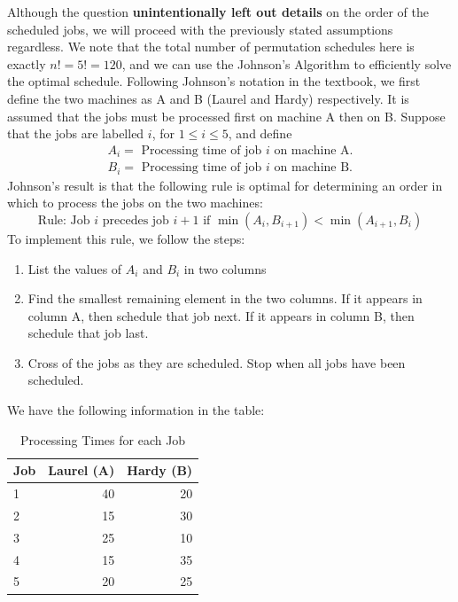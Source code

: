 \documentclass[12pt]{article}
\begin{document}
\noindent Although the question \textbf{unintentionally left out details} on the order of the scheduled jobs, we will proceed with the previously stated assumptions regardless. We note that the total number of permutation schedules here is exactly $n! = 5! = 120$, and we can use the Johnson's Algorithm to efficiently solve the optimal schedule. Following Johnson's notation in the textbook, we first define the two machines as A and B (Laurel and Hardy) respectively. It is assumed that the jobs must be processed first on machine A then on B. Suppose that the jobs are labelled $i$, for $1\leq i\leq 5$, and define \begin{align*}
    A_i = \text{ Processing time of job } i \text{ on machine A}. \\ 
    B_i = \text{ Processing time of job } i \text{ on machine B}.
\end{align*} Johnson's result is that the following rule is optimal for determining an order in which to process the jobs on the two machines: \begin{equation*}
    \text{Rule: Job } i \text{ precedes job } i + 1 \text{ if } \min (A_i, B_{i+1}) < \min (A_{i+1}, B_i)
\end{equation*} To implement this rule, we follow the steps: \begin{enumerate}
    \item List the values of $A_i$ and $B_i$ in two columns
    \item Find the smallest remaining element in the two columns. If it appears in column A, then schedule that job next. If it appears in column B, then schedule that job last. 
    \item Cross of the jobs as they are scheduled. Stop when all jobs have been scheduled. 
\end{enumerate} We have the following information in the table: \begin{table}[H]
    \centering
    \begin{tabular}{l r r }\toprule
        \textbf{Job} & \textbf{Laurel (A)} & \textbf{Hardy (B)} \\ \midrule
        1 & 40 & 20 \\ 
        2 & 15 & 30 \\ 
        3 & 25 & 10 \\
        4 & 15 & 35 \\ 
        5 & 20 & 25 \\ \bottomrule
    \end{tabular}
    \caption{Processing Times for each Job}
    \label{tab:5-johnson}
\end{table} 
\end{document}
